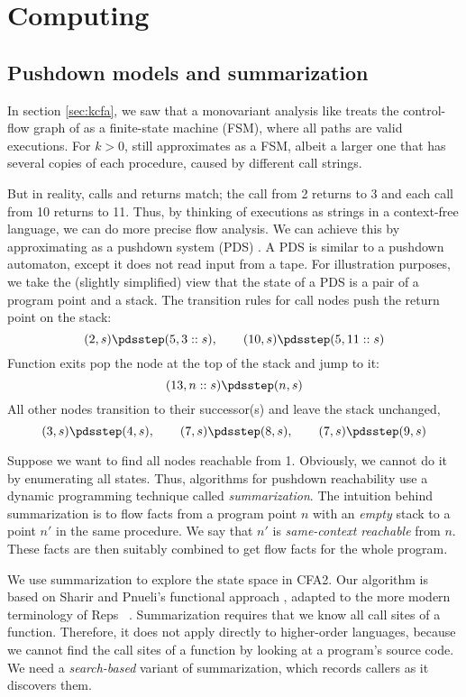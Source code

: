 \documentclass{LMCS}
\theoremstyle{definition} \newtheorem{property}[thm]{Property}
\begin{document}
\section{Computing \cfat\label{sec:summarization}}

\subsection{Pushdown models and summarization}

In section \ref{sec:kcfa}, we saw that a monovariant analysis like 
treats the control-flow graph of  as a finite-state machine (FSM),
where all paths are valid executions.
For $k>0$, \kcfa{} still approximates  as a FSM, albeit a larger one
that has several copies of each procedure, caused by different call strings.

But in reality, calls and returns match; the call from 2 returns to 3 and each
call from 10 returns to 11.
Thus, by thinking of executions as strings in a context-free language, we can do
more precise flow analysis.
We can achieve this by approximating  as a pushdown system (PDS)
\cite{journal/entcs/97/finkel/pds, conf/concur/97/bouajjani/pds}.
A PDS is similar to a pushdown automaton, except it does not read input from a
tape.
For illustration purposes, we take the (slightly simplified) view that the state
of a PDS is a pair of a program point and a stack.
The transition rules for call nodes push the return point on the stack:
$$(2, s) \pdsstep (5, 3::s), \qquad (10, s) \pdsstep (5, 11::s)$$
Function exits pop the node at the top of the stack and jump to it:
$$(13, n::s) \pdsstep (n, s)$$
All other nodes transition to their successor(s) and leave the stack unchanged,
\eg
$$(3,s) \pdsstep (4,s),\qquad (7,s) \pdsstep (8,s),\qquad (7,s) \pdsstep (9,s)$$

Suppose we want to find all nodes reachable from 1.
Obviously, we cannot do it by enumerating all states.
Thus, algorithms for pushdown reachability use a dynamic programming technique
called \emph{summarization}.
The intuition behind summarization is to flow facts from a program point $n$ 
with an \emph{empty} stack to a point $n'$ in the same procedure.
We say that $n'$ is \emph{same-context reachable} from $n$.
These facts are then suitably combined to get flow facts for the whole program.

We use summarization to explore the state space in CFA2.
Our algorithm is based on Sharir and Pnueli's functional approach 
\cite[pg.\ 207]{book/flowanalysis/81/sharir/interproc}, adapted to the more
modern terminology of Reps \etal~\cite{conf/popl/95/reps/interproc}.
Summarization requires that we know all call sites of a function.
Therefore, it does not apply directly to higher-order languages, because we
cannot find the call sites of a function by looking at a program's source code.
We need a \emph{search-based} variant of summarization, which records callers as
it discovers them.
\end{document}

